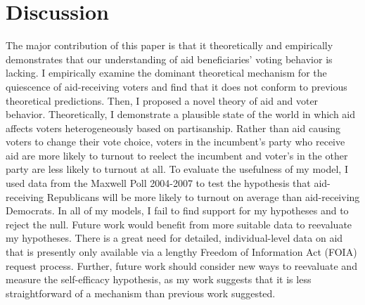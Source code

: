 \documentclass[12pt]{paper}
\begin{document}
\section{Discussion}
The major contribution of this paper is that it theoretically and empirically demonstrates that our understanding of aid beneficiaries' voting behavior is lacking. I empirically examine the dominant theoretical mechanism for the quiescence of aid-receiving voters and find that it does not conform to previous theoretical predictions. Then, I proposed a novel theory of aid and voter behavior. Theoretically, I demonstrate a plausible state of the world in which aid affects voters heterogeneously based on partisanship. Rather than aid causing voters to change their vote choice, voters in the incumbent's party who receive aid are more likely to turnout to reelect the incumbent and voter's in the other party are less likely to turnout at all. To evaluate the usefulness of my model, I used data from the Maxwell Poll 2004-2007 to test the hypothesis that aid-receiving Republicans will be more likely to turnout on average than aid-receiving Democrats. In all of my models, I fail to find support for my hypotheses and to reject the null. Future work would benefit from more suitable data to reevaluate my hypotheses. There is a great need for detailed, individual-level data on aid that is presently only available via a lengthy Freedom of Information Act (FOIA) request process. Further, future work should consider new ways to reevaluate and measure the self-efficacy hypothesis, as my work suggests that it is less straightforward of a mechanism than previous work suggested.

%
%

\clearpage
\end{document}
